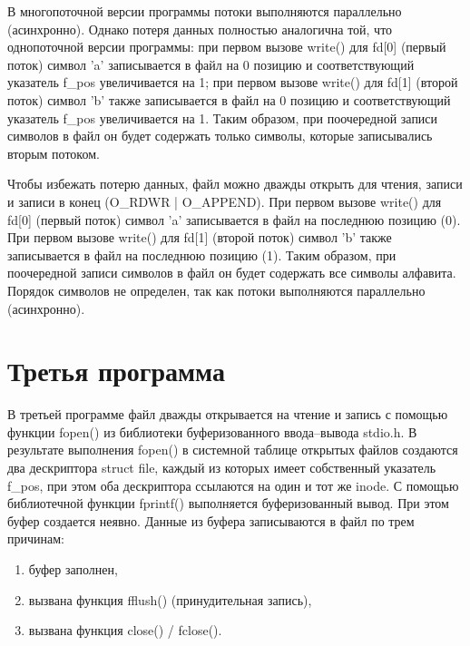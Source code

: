 В многопоточной версии программы потоки выполняются параллельно (асинхронно).
Однако потеря данных полностью аналогична той, что однопоточной версии программы: при первом вызове write() для fd[0] (первый поток) символ 'a' записывается в файл на 0 позицию и соответствующий указатель f\_pos увеличивается на 1; при первом вызове write() для fd[1] (второй поток) символ 'b' также записывается в файл на 0 позицию и соответствующий указатель f\_pos увеличивается на 1.
Таким образом, при поочередной записи символов в файл он будет содержать только символы, которые записывались вторым потоком.

Чтобы избежать потерю данных, файл можно дважды открыть для чтения, записи и записи в конец (O\_RDWR | O\_APPEND).
При первом вызове write() для fd[0] (первый поток) символ 'a' записывается в файл на последнюю позицию (0).
При первом вызове write() для fd[1] (второй поток) символ 'b' также записывается в файл на последнюю позицию (1).
Таким образом, при поочередной записи символов в файл он будет содержать все символы алфавита.
Порядок символов не определен, так как потоки выполняются параллельно (асинхронно).

\clearpage

\section{Третья программа}



В третьей программе файл дважды открывается на чтение и запись с помощью функции fopen() из библиотеки буферизованного ввода--вывода stdio.h.
В результате выполнения fopen() в системной таблице открытых файлов создаются два дескриптора struct file, каждый из которых имеет собственный указатель f\_pos, при этом оба дескриптора ссылаются на один и тот же inode.
С помощью библиотечной функции fprintf() выполняется буферизованный вывод.
При этом буфер создается неявно.
Данные из буфера записываются в файл по трем причинам:

\begin{enumerate}
	\item буфер заполнен,
	\item вызвана функция fflush() (принудительная запись),
	\item вызвана функция close() / fclose().
\end{enumerate}

